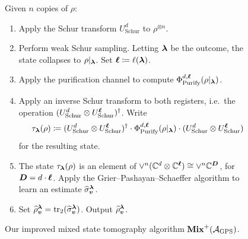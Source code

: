 \documentclass{article}
\newcommand{\mixed}{\textup{\textbf{Mix}}}
\newcommand{\purifychan}{\Phi_{\mathrm{Purify}}}
\newcommand{\schur}{U_{\mathrm{Schur}}}
\begin{document}
{
\begin{figure}[H]
Given $n$ copies of $\rho$:
\begin{enumerate}
    \item Apply the Schur transform $\schur^d$ to $\rho^{\otimes n}$.
    \item Perform weak Schur sampling. Letting $\boldsymbol{\lambda}$ be the outcome, the state collapses to $\rho|_{\boldsymbol{\lambda}}$.
    Set $\boldsymbol{\ell} \coloneqq \ell(\boldsymbol{\lambda})$.
    \item Apply the purification channel to compute $\purifychan^{d, \bell}(\rho|_{\blambda})$. 
    \item Apply an inverse Schur transform to both registers, i.e.\ the operation $(\schur^d \otimes \schur^{\bell})^{\dagger}$.
    Write
    \begin{equation*}
        \tau_{\blambda}(\rho) \coloneqq (\schur^d \otimes \schur^{\bell})^{\dagger} \cdot \purifychan^{d, \bell}(\rho|_{\blambda}) \cdot (\schur^d \otimes \schur^{\bell})
    \end{equation*}
    for the resulting state.
    \item
    The state $\tau_{\boldsymbol{\lambda}}(\rho)$ is an element of $\lor^n (\mathbb C^d \otimes \mathbb C^{\boldsymbol{\ell}}) \cong \lor^n \mathbb C^{\boldsymbol{D}}$, for $\boldsymbol{D} = d\cdot \boldsymbol{\ell}$.
    Apply the Grier--Pashayan--Schaeffer algorithm to learn an estimate $\widehat{\sigma}_{\boldsymbol{v}}^{\boldsymbol{\lambda}}$.
    \item Set $\widehat{\rho}^{\boldsymbol{\lambda}}_{\boldsymbol{v}} = \tr_2(\widehat{\sigma}_{\boldsymbol{v}}^{\boldsymbol{\lambda}})$. Output $\widehat{\rho}^{\boldsymbol{\lambda}}_{\boldsymbol{v}}$.
\end{enumerate}
\caption{Our improved mixed state tomography algorithm $\mixed^+(\calA_{\mathrm{GPS}})$.}
\label{fig:gps-reduction-improved}
\end{figure}
}
\end{document}
